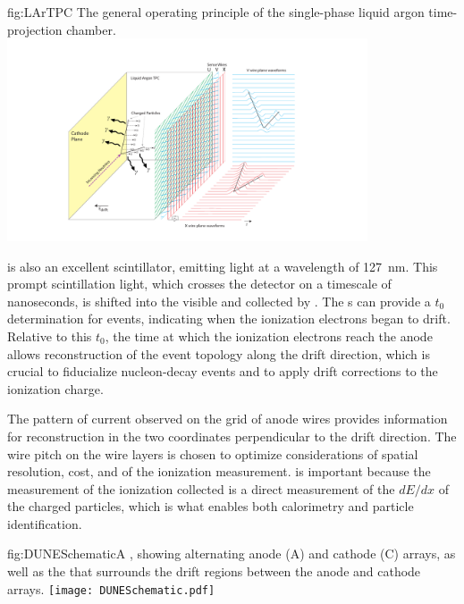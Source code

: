 \begin{dunefigure}{fig:LArTPC}
{The general operating principle of the single-phase liquid argon time-projection chamber.}
\includegraphics[trim={5cm 0 5cm 0},clip,width=0.8\textwidth]{graphics/TheBoPicture.pdf}
\end{dunefigure}

 is also an excellent scintillator, emitting  light at a wavelength of \SI{127}{\nano\meter}. This prompt scintillation light, which crosses the detector on a timescale of nanoseconds, is shifted into the visible and collected by . The s can provide a $t_{0}$ determination for events, indicating when the ionization electrons began to drift. Relative to this $t_{0}$, the time at which the ionization electrons reach the anode allows reconstruction of the event topology along the drift direction, which is crucial to fiducialize nucleon-decay events and to apply drift corrections to the ionization charge.

The pattern of current observed on the grid of anode wires provides information for reconstruction in the two coordinates perpendicular to the drift direction. The wire pitch on the wire layers is chosen to optimize considerations of  spatial resolution, cost, and  of the ionization measurement.  is important because the measurement of the ionization collected is a direct measurement of the $dE/dx$ of the charged particles, which is what enables both calorimetry and particle identification.


\begin{dunefigure}{fig:DUNESchematic}{A \nominalmodsize {}  , showing alternating anode (A) and cathode (C) arrays, as well as the  that surrounds the drift regions between the anode and cathode arrays.}
\texttt{[image: DUNESchematic.pdf]}
\end{dunefigure}

